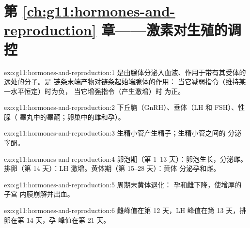 \section*{第 \ref{ch:g11:hormones-and-reproduction} 章——激素对生殖的调控}

\begin{solution}{exo:g11:hormones-and-reproduction:1}
是由腺体分泌入血液、作用于带有其受体的远处的分子。是
链条末端产物对链条起始端腺体的作用：
当它减弱指令（维持某一水平恒定）时为负，
当它增强指令（产生激增）时
为正。
\end{solution}

\begin{solution}{exo:g11:hormones-and-reproduction:2}
下丘脑（GnRH）、垂体（LH 和 FSH）、性腺（
睾丸中的睾酮；卵巢中的雌和孕）。
\end{solution}

\begin{solution}{exo:g11:hormones-and-reproduction:3}
生精小管产生精子；生精小管之间的
分泌睾酮。
\end{solution}

\begin{solution}{exo:g11:hormones-and-reproduction:4}
卵泡期（第 1--13 天）：卵泡生长，分泌雌。
排卵（第 14 天）：LH 激增。黄体期（第 15--28 天）：黄体
分泌孕和雌。
\end{solution}

\begin{solution}{exo:g11:hormones-and-reproduction:5}
周期末黄体退化：
孕和雌下降，使增厚的子宫
内膜崩解并出血。
\end{solution}

\begin{solution}{exo:g11:hormones-and-reproduction:6}
雌峰值在第 12 天，LH 峰值在第 13 天，排卵在第 14 天，孕
峰值在第 21 天。
\end{solution}

